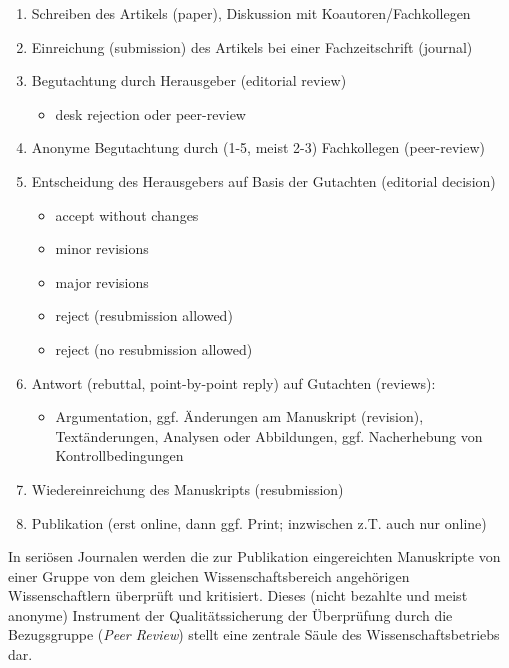 \documentclass[
]{book}
\providecommand{\tightlist}{%
  \setlength{\itemsep}{0pt}\setlength{\parskip}{0pt}}
\begin{document}
\begin{enumerate}
\def\labelenumi{\arabic{enumi}.}
\item
  Schreiben des Artikels (paper), Diskussion mit Koautoren/Fachkollegen
\item
  Einreichung (submission) des Artikels bei einer Fachzeitschrift (journal)
\item
  Begutachtung durch Herausgeber (editorial review)

  \begin{itemize}
  \tightlist
  \item
    desk rejection oder peer-review
  \end{itemize}
\item
  Anonyme Begutachtung durch (1-5, meist 2-3) Fachkollegen (peer-review)
\item
  Entscheidung des Herausgebers auf Basis der Gutachten (editorial decision)

  \begin{itemize}
  \tightlist
  \item
    accept without changes
  \item
    minor revisions
  \item
    major revisions
  \item
    reject (resubmission allowed)
  \item
    reject (no resubmission allowed)
  \end{itemize}
\item
  Antwort (rebuttal, point-by-point reply) auf Gutachten (reviews):

  \begin{itemize}
  \tightlist
  \item
    Argumentation, ggf. Änderungen am Manuskript (revision), Textänderungen, Analysen oder Abbildungen, ggf. Nacherhebung von Kontrollbedingungen
  \end{itemize}
\item
  Wiedereinreichung des Manuskripts (resubmission)
\item
  Publikation (erst online, dann ggf. Print; inzwischen z.T. auch nur online)
\end{enumerate}

In seriösen Journalen werden die zur Publikation eingereichten Manuskripte von einer Gruppe von dem gleichen Wissenschaftsbereich angehörigen Wissenschaftlern überprüft und kritisiert. Dieses (nicht bezahlte und meist anonyme) Instrument der Qualitätssicherung der Überprüfung durch die Bezugsgruppe (\emph{Peer Review}) stellt eine zentrale Säule des Wissenschaftsbetriebs dar.
\end{document}
